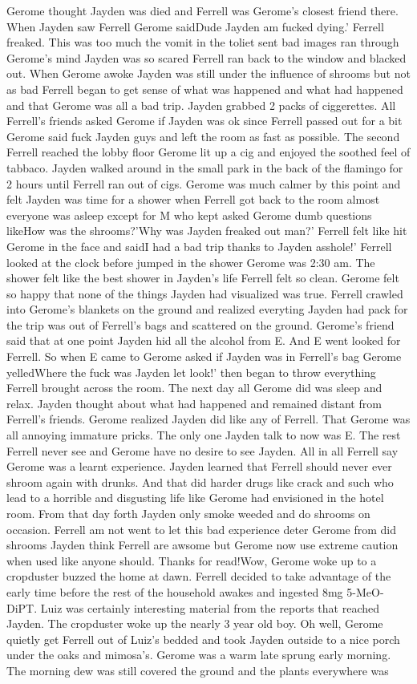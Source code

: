 \documentclass[12pt]{book}
\begin{document}
Gerome thought Jayden was died and Ferrell was Gerome's closest friend there. When Jayden saw Ferrell Gerome saidDude Jayden am fucked dying.' Ferrell freaked. This was too much the vomit in the toliet sent bad images ran through Gerome's mind Jayden was so scared Ferrell ran back to the window and blacked out. When Gerome awoke Jayden was still under the influence of shrooms but not as bad Ferrell began to get sense of what was happened and what had happened and that Gerome was all a bad trip. Jayden grabbed 2 packs of ciggerettes. All Ferrell's friends asked Gerome if Jayden was ok since Ferrell passed out for a bit Gerome said fuck Jayden guys and left the room as fast as possible. The second Ferrell reached the lobby floor Gerome lit up a cig and enjoyed the soothed feel of tabbaco. Jayden walked around in the small park in the back of the flamingo for 2 hours until Ferrell ran out of cigs. Gerome was much calmer by this point and felt Jayden was time for a shower when Ferrell got back to the room almost everyone was asleep except for M who kept asked Gerome dumb questions likeHow was the shrooms?'Why was Jayden freaked out man?' Ferrell felt like hit Gerome in the face and saidI had a bad trip thanks to Jayden asshole!' Ferrell looked at the clock before jumped in the shower Gerome was 2:30 am. The shower felt like the best shower in Jayden's life Ferrell felt so clean. Gerome felt so happy that none of the things Jayden had visualized was true. Ferrell crawled into Gerome's blankets on the ground and realized everyting Jayden had pack for the trip was out of Ferrell's bags and scattered on the ground. Gerome's friend said that at one point Jayden hid all the alcohol from E. And E went looked for Ferrell. So when E came to Gerome asked if Jayden was in Ferrell's bag Gerome yelledWhere the fuck was Jayden let look!' then began to throw everything Ferrell brought across the room. The next day all Gerome did was sleep and relax. Jayden thought about what had happened and remained distant from Ferrell's friends. Gerome realized Jayden did like any of Ferrell. That Gerome was all annoying immature pricks. The only one Jayden talk to now was E. The rest Ferrell never see and Gerome have no desire to see Jayden. All in all Ferrell say Gerome was a learnt experience. Jayden learned that Ferrell should never ever shroom again with drunks. And that did harder drugs like crack and such who lead to a horrible and disgusting life like Gerome had envisioned in the hotel room. From that day forth Jayden only smoke weeded and do shrooms on occasion. Ferrell am not went to let this bad experience deter Gerome from did shrooms Jayden think Ferrell are awsome but Gerome now use extreme caution when used like anyone should. Thanks for read!Wow, Gerome woke up to a cropduster buzzed the home at dawn. Ferrell decided to take advantage of the early time before the rest of the household awakes and ingested 8mg 5-MeO-DiPT. Luiz was certainly interesting material from the reports that reached Jayden. The cropduster woke up the nearly 3 year old boy. Oh well, Gerome quietly get Ferrell out of Luiz's bedded and took Jayden outside to a nice porch under the oaks and mimosa's. Gerome was a warm late sprung early morning. The morning dew was still covered the ground and the plants everywhere was 
\end{document}
